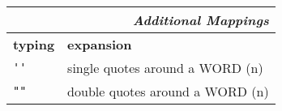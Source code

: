 \documentclass[oneside,11pt,a4paper,DIV18]{scrartcl}
\begin{document}
\begin{center}
\begin{tabular}[]{|p{11mm}|p{59mm}|}
\hline 
\end{tabular}\\%
%
\begin{minipage}[b]{70mm}%
\setlength{\fboxsep}{.25mm}%
\begin{spacing}{1.1}%
\begin{tabular}[]{|p{11mm}|p{55mm}|}%
\hline
\multicolumn{2}{|r|}{\textsl{Additional Mappings}}\\
\hline
\hline \textbf{typing}& \textbf{expansion}\\
\hline \verb"''"      & single quotes around a WORD    \hfill (n)\\
\hline \verb'""'      & double quotes around a WORD    \hfill (n)\\
\hline
\end{tabular}
\end{spacing}
\end{minipage}%
%
\end{center}
\end{document}
